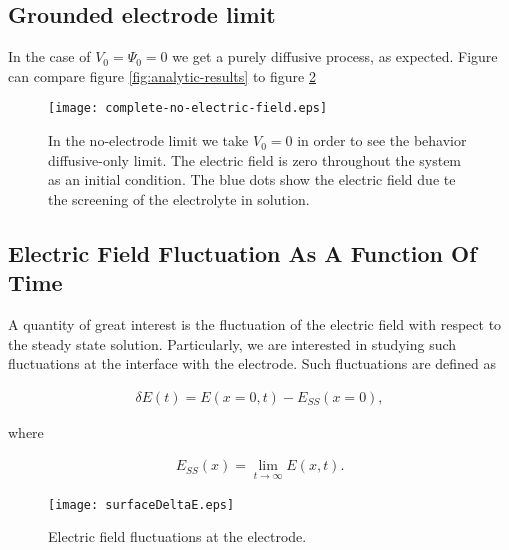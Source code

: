\newpage
\subsection{Grounded electrode limit}

In the case of $V_0 = \Psi_0 = 0$ we get a purely diffusive process, as expected. Figure can compare figure \ref{fig:analytic-results} to figure \ref{fig:nernts-no-field}


\begin{figure}[htbp]
\centering
\texttt{[image: complete-no-electric-field.eps]}
\caption{In the no-electrode limit we take $V_0=0$ in order to see the behavior diffusive-only limit. The electric field is zero throughout the system as an initial condition. The blue dots show the electric field due te the screening of the electrolyte in solution. }
\label{fig:nernts-no-field}
\end{figure}


\newpage
\subsection{Electric Field Fluctuation As A Function Of Time}


A quantity of great interest is the fluctuation of the electric field with respect to the steady state solution. Particularly, we are interested in studying such fluctuations at the interface with the electrode. Such fluctuations are defined as

\begin{align}
	\delta E(t) = E(x=0, t) - E_{SS}(x=0), 
\end{align}

where 

\begin{align}
	E_{SS}(x) = \lim_{t\rightarrow\infty} E(x,t).
\end{align}



\begin{figure}[htbp]
\centering
\texttt{[image: surfaceDeltaE.eps]}
\caption{Electric field fluctuations at the electrode.}
\label{fig:nernts-no-field}
\end{figure}


\newpage



